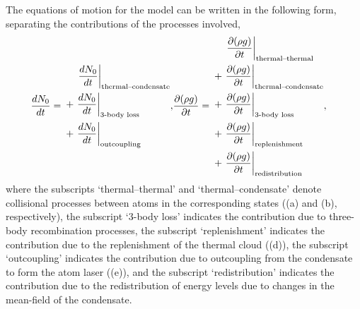 The equations of motion for the model can be written in the following form, separating the contributions of the processes involved,
\begin{align}
    \frac{d N_0}{d t} =\begin{split}
        &\relphantom{+}\left. \frac{d N_0}{d t}\right|_\text{thermal--condensate} \\
        &+\left. \frac{d N_0}{d t}\right|_\text{3-body loss} \\
        &+\left. \frac{d N_0}{d t}\right|_\text{outcoupling}
    \end{split},
    & \frac{\partial (\rho g)}{\partial t} = \begin{split}
        &\relphantom{+}\left. \frac{\partial (\rho g)}{\partial t}\right|_\text{thermal--thermal} \\
        &+\left. \frac{\partial (\rho g)}{\partial t}\right|_\text{thermal--condensate} \\
        &+\left. \frac{\partial (\rho g)}{\partial t}\right|_\text{3-body loss} \\
        &+\left. \frac{\partial (\rho g)}{\partial t}\right|_\text{replenishment} \\
        &+\left. \frac{\partial (\rho g)}{\partial t}\right|_\text{redistribution}
    \end{split},
    \label{KineticTheory:EvolutionEquations}
\end{align}
where the subscripts `thermal--thermal' and `thermal--condensate' denote collisional processes between atoms in the corresponding states ((a) and (b), respectively), the subscript `3-body loss' indicates the contribution due to three-body recombination processes, the subscript `replenishment' indicates the contribution due to the replenishment of the thermal cloud ((d)), the subscript `outcoupling' indicates the contribution due to outcoupling from the condensate to form the atom laser ((e)), and the subscript `redistribution' indicates the contribution due to the redistribution of energy levels due to changes in the mean-field of the condensate. 

